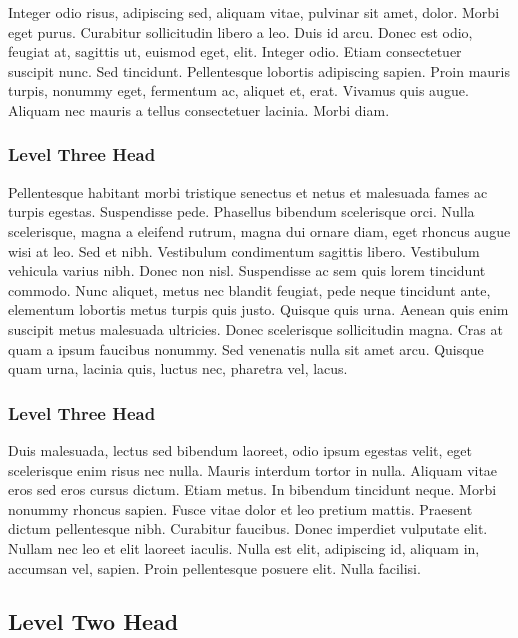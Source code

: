 Integer odio risus, adipiscing sed, aliquam vitae, pulvinar sit
amet, dolor. Morbi eget purus. Curabitur sollicitudin libero a
leo. Duis id arcu. Donec est odio, feugiat at, sagittis ut,
euismod eget, elit. Integer odio. Etiam consectetuer suscipit
nunc. Sed tincidunt. Pellentesque lobortis adipiscing sapien.
Proin mauris turpis, nonummy eget, fermentum ac, aliquet et,
erat. Vivamus quis augue. Aliquam nec mauris a tellus
consectetuer lacinia. Morbi diam.

\subsubsection{Level Three Head}

Pellentesque habitant morbi tristique senectus et netus et
malesuada fames ac turpis egestas. Suspendisse pede. Phasellus
bibendum scelerisque orci. Nulla scelerisque, magna a eleifend
rutrum, magna dui ornare diam, eget rhoncus augue wisi at leo.
Sed et nibh. Vestibulum condimentum sagittis libero. Vestibulum
vehicula varius nibh. Donec non nisl. Suspendisse ac sem quis
lorem tincidunt commodo. Nunc aliquet, metus nec blandit feugiat,
pede neque tincidunt ante, elementum lobortis metus turpis quis
justo. Quisque quis urna. Aenean quis enim suscipit metus
malesuada ultricies. Donec scelerisque sollicitudin magna. Cras
at quam a ipsum faucibus nonummy. Sed venenatis nulla sit amet
arcu. Quisque quam urna, lacinia quis, luctus nec, pharetra vel,
lacus.

\subsubsection{Level Three Head}

Duis malesuada, lectus sed bibendum laoreet, odio ipsum egestas
velit, eget scelerisque enim risus nec nulla. Mauris interdum
tortor in nulla. Aliquam vitae eros sed eros cursus dictum. Etiam
metus. In bibendum tincidunt neque. Morbi nonummy rhoncus sapien.
Fusce vitae dolor et leo pretium mattis. Praesent dictum
pellentesque nibh. Curabitur faucibus. Donec imperdiet vulputate
elit. Nullam nec leo et elit laoreet iaculis. Nulla est elit,
adipiscing id, aliquam in, accumsan vel, sapien. Proin
pellentesque posuere elit. Nulla facilisi.

\subsection{Level Two Head}

